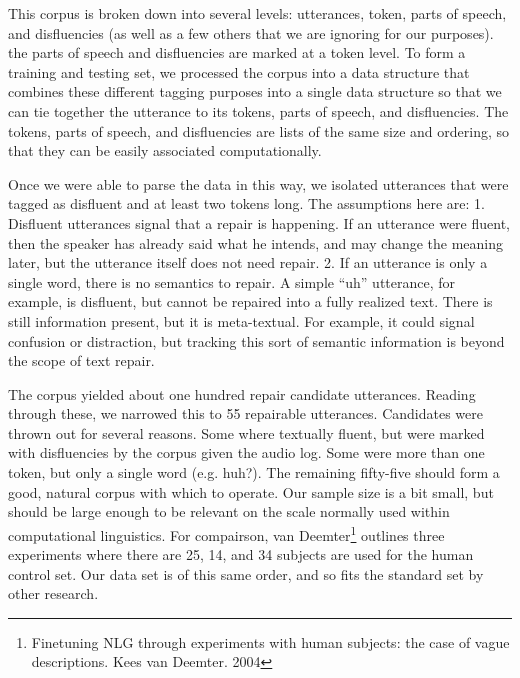 \documentclass{article}
\begin{document}
\begin{flushleft}

This corpus is broken down into several levels: utterances, token, parts of speech, and disfluencies (as well as a few others that we are ignoring for our purposes). the parts of speech and disfluencies are marked at a token level. To form a training and testing set, we processed the corpus into a data structure that combines these different tagging purposes into a single data structure so that we can tie together the utterance to its tokens, parts of speech, and disfluencies. The tokens, parts of speech, and disfluencies are lists of the same size and ordering, so that they can be easily associated computationally.

\end{flushleft}

\begin{flushleft}

  Once we were able to parse the data in this way, we isolated utterances that were tagged as disfluent and at least two tokens long. The assumptions here are: 1. Disfluent utterances signal that a repair is happening. If an utterance were fluent, then the speaker has already said what he intends, and may change the meaning later, but the utterance itself does not need repair. 2. If an utterance is only a single word, there is no semantics to repair. A simple ``uh'' utterance, for example, is disfluent, but cannot be repaired into a fully realized text. There is still information present, but it is meta-textual. For example, it could signal confusion or distraction, but tracking this sort of semantic information is beyond the scope of text repair.

\end{flushleft}

\begin{flushleft}

  The corpus yielded about one hundred repair candidate utterances. Reading through these, we narrowed this to 55 repairable utterances. Candidates were thrown out for several reasons. Some where textually fluent, but were marked with disfluencies by the corpus given the audio log. Some were more than one token, but only a single word (e.g. huh?). The remaining fifty-five should form a good, natural corpus with which to operate. Our sample size is a bit small, but should be large enough to be relevant on the scale normally used within computational linguistics. For compairson, van Deemter\footnote{Finetuning NLG through experiments with human subjects: the case of vague descriptions. Kees van Deemter. 2004} outlines three experiments where there are 25, 14, and 34 subjects are used for the human control set. Our data set is of this same order, and so fits the standard set by other research.

\end{flushleft}
\end{document}
